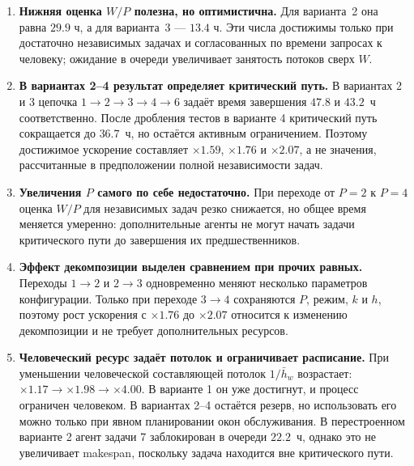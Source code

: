 \documentclass[12pt,a4paper]{article}
\theoremstyle{definition}
\begin{document}
\begin{enumerate}
  \item \textbf{Нижняя оценка $W/P$ полезна, но оптимистична.} Для варианта~2 она равна $29.9$ ч, а для варианта~3 --- $13.4$ ч. Эти числа достижимы только при достаточно независимых задачах и согласованных по времени запросах к человеку; ожидание в очереди увеличивает занятость потоков сверх $W$.

  \item \textbf{В вариантах 2--4 результат определяет критический путь.} В вариантах 2 и 3 цепочка $1 \to 2 \to 3 \to 4 \to 6$ задаёт время завершения $47.8$ и $43.2$~ч соответственно. После дробления тестов в варианте 4 критический путь сокращается до $36.7$~ч, но остаётся активным ограничением. Поэтому достижимое ускорение составляет $\times 1.59$, $\times 1.76$ и $\times 2.07$, а не значения, рассчитанные в предположении полной независимости задач.

  \item \textbf{Увеличения $P$ самого по себе недостаточно.} При переходе от $P=2$ к $P=4$ оценка $W/P$ для независимых задач резко снижается, но общее время меняется умеренно: дополнительные агенты не могут начать задачи критического пути до завершения их предшественников.

  \item \textbf{Эффект декомпозиции выделен сравнением при прочих равных.} Переходы $1 \to 2$ и $2 \to 3$ одновременно меняют несколько параметров конфигурации. Только при переходе $3 \to 4$ сохраняются $P$, режим, $k$ и $h$, поэтому рост ускорения с $\times 1.76$ до $\times 2.07$ относится к изменению декомпозиции и не требует дополнительных ресурсов.

  \item \textbf{Человеческий ресурс задаёт потолок и ограничивает расписание.} При уменьшении человеческой составляющей потолок $1/\bar{h}_w$ возрастает: $\times 1.17 \to \times 1.98 \to \times 4.00$. В варианте 1 он уже достигнут, и процесс ограничен человеком. В вариантах 2--4 остаётся резерв, но использовать его можно только при явном планировании окон обслуживания. В перестроенном варианте 2 агент задачи 7 заблокирован в очереди $22.2$~ч, однако это не увеличивает makespan, поскольку задача находится вне критического пути.


\end{enumerate}
\end{document}
